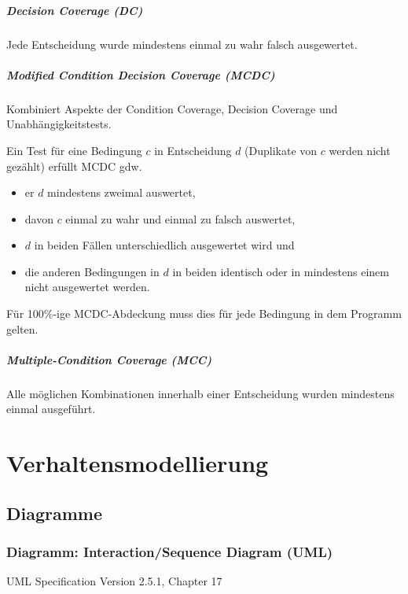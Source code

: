 				\paragraph{Decision Coverage (DC)}
					Jede Entscheidung wurde mindestens einmal zu wahr falsch ausgewertet.

				\paragraph{Modified Condition Decision Coverage (MCDC)}
					Kombiniert Aspekte der Condition Coverage, Decision Coverage und Unabhängigkeitstests.

					Ein Test für eine Bedingung $ c $ in Entscheidung $ d $ (Duplikate von $ c $ werden nicht gezählt) erfüllt MCDC gdw.
					\begin{itemize}
						\item er $ d $ mindestens zweimal auswertet,
						\item davon $ c $ einmal zu wahr und einmal zu falsch auswertet,
						\item $ d $ in beiden Fällen unterschiedlich ausgewertet wird und
						\item die anderen Bedingungen in $ d $ in beiden identisch oder in mindestens einem nicht ausgewertet werden.
					\end{itemize}
					Für 100\%-ige MCDC-Abdeckung muss dies für jede Bedingung in dem Programm gelten.

				\paragraph{Multiple-Condition Coverage (MCC)}
					Alle möglichen Kombinationen innerhalb einer Entscheidung wurden mindestens einmal ausgeführt.

\chapter{Verhaltensmodellierung}
	\section{Diagramme}
		\subsection{Diagramm: Interaction/Sequence Diagram (UML)}
			\label{diagram:umlsequence}

			{ \footnotesize UML Specification Version 2.5.1, Chapter 17}

